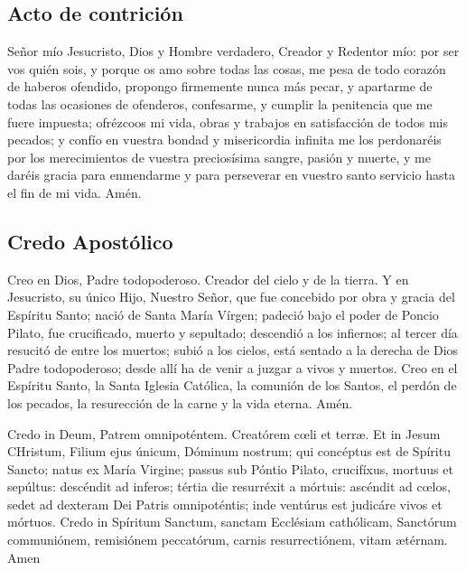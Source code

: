 \documentclass[./devocionario.tex]{subfiles}
\begin{document}
\subsection*{Acto de contrición}
Señor mío Jesucristo, Dios y Hombre verdadero, Creador y Redentor mío: por ser vos quién sois, y porque os amo sobre todas las cosas, 
me pesa de todo corazón de haberos ofendido, propongo firmemente nunca más pecar, y apartarme de todas las ocasiones de ofenderos, 
confesarme, y cumplir la penitencia que me fuere impuesta; ofrézcoos mi vida, obras y trabajos en satisfacción de todos mis pecados; 
y confío en vuestra bondad y misericordia infinita me los perdonaréis por los merecimientos de vuestra preciosísima sangre, pasión y muerte, 
y me daréis gracia para enmendarme y para perseverar en vuestro santo servicio hasta el fin de mi vida. Amén.

\subsection*{Credo Apostólico}
\begin{multicols}{2}
    Creo en Dios, Padre todopoderoso. Creador del cielo y de la tierra. Y en Jesucristo, su único Hijo, Nuestro Señor, 
    que fue concebido por obra y gracia del Espíritu Santo; nació de Santa María Vírgen; padeció bajo el poder de Poncio Pilato, 
    fue crucificado, muerto y sepultado; descendió a los infiernos; al tercer día resucitó de entre los muertos; subió a los cielos, 
    está sentado a la derecha de Dios Padre todopoderoso; desde allí ha de venir a juzgar a vivos y muertos. 
    Creo en el Espíritu Santo, la Santa Iglesia Católica, la comunión de los Santos, el perdón de los pecados, 
    la resurección de la carne y la vida eterna. Amén.

    \columnbreak

    Credo in Deum, Patrem omnipoténtem. Creatórem cœli et terræ. Et in Jesum CHristum, Filium ejus únicum, Dóminum nostrum; 
    qui concéptus est de Spíritu Sancto; natus ex María Virgine; passus sub Póntio Pilato, crucifíxus, mortuus et sepúltus: 
    descéndit ad inferos; tértia die resurréxit a mórtuis: ascéndit ad cœlos, sedet ad dexteram Dei Patris omnipoténtis; 
    inde ventúrus est judicáre vivos et mórtuos. Credo in Spíritum Sanctum, sanctam Ecclésiam cathólicam, Sanctórum communiónem, 
    remisiónem peccatórum, carnis resurrectiónem, vitam ætérnam. Amen
\end{multicols}
\end{document}
